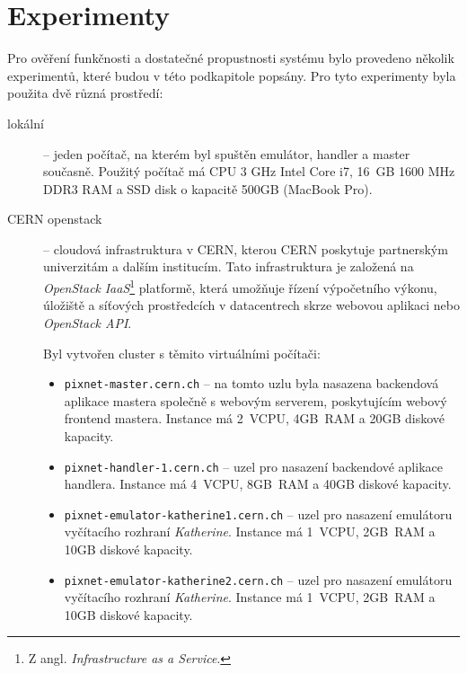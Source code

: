 \section{Experimenty}
Pro ověření funkčnosti a dostatečné propustnosti systému bylo provedeno několik experimentů, které budou v této podkapitole popsány. Pro tyto experimenty byla použita dvě různá prostředí:
\begin{description}
    \item[lokální] -- jeden počítač, na kterém byl spuštěn emulátor, handler a master současně. Použitý počítač má CPU 3 GHz Intel Core i7, 16 GB 1600 MHz DDR3 RAM a SSD disk o kapacitě \unit{500}{GB} (MacBook Pro).
    \item[CERN openstack] -- cloudová infrastruktura v CERN, kterou CERN poskytuje partnerským univerzitám a dalším institucím. Tato infrastruktura je založená na \textit{OpenStack} \textit{IaaS}\footnote{Z angl. \textit{Infrastructure as a Service}.} platformě, která umožňuje řízení výpočetního výkonu, úložiště a síťových prostředcích v datacentrech skrze webovou aplikaci nebo \textit{OpenStack API}.

    Byl vytvořen cluster s těmito virtuálními počítači:
    \begin{itemize}
        \item \texttt{pixnet-master.cern.ch} -- na tomto uzlu byla nasazena backendová aplikace mastera společně s webovým serverem, poskytujícím webový frontend mastera. Instance má 2~VCPU, \unit{4}{GB}~RAM a \unit{20}{GB} diskové kapacity.
        \item \texttt{pixnet-handler-1.cern.ch} -- uzel pro nasazení backendové aplikace handlera. Instance má 4~VCPU, \unit{8}{GB}~RAM a \unit{40}{GB} diskové kapacity.
        \item \texttt{pixnet-emulator-katherine1.cern.ch} -- uzel pro nasazení emulátoru vyčítacího rozhraní \textit{Katherine}. Instance má 1~VCPU, \unit{2}{GB}~RAM a \unit{10}{GB} diskové kapacity.
        \item \texttt{pixnet-emulator-katherine2.cern.ch} -- uzel pro nasazení emulátoru vyčítacího rozhraní \textit{Katherine}. Instance má 1~VCPU, \unit{2}{GB}~RAM a \unit{10}{GB} diskové kapacity.
    \end{itemize}

\end{description}

